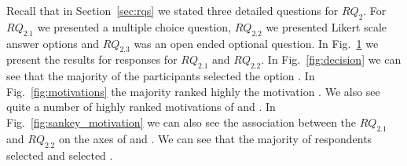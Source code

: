 \begin{figure}[ht]
\centering
\vspace{-.3cm}
    \hfill
    \hfill
    \hfill
    \caption{\rqTwo}
     \label{fig:decision_motivations}
     \vspace{-.3cm}
\end{figure}




\nd \textbf{\rqTwo}

Recall that in Section~\ref{sec:rqs} we stated three detailed questions for $RQ_{2}$. For $RQ_{2.1}$ we presented a multiple choice question, $RQ_{2.2}$ we presented Likert scale answer options and $RQ_{2.3}$ was an open ended optional question. 
In Fig.~\ref{fig:decision_motivations} we present the results for responses for $RQ_{2.1}$ and $RQ_{2.2}$. In Fig.~\ref{fig:decision} we can see that the majority of the participants selected the option . In Fig.~\ref{fig:motivations} the majority ranked highly the motivation . We also see quite a number of highly ranked motivations of  and . In Fig.~\ref{fig:sankey_motivation} we can also see the association between the $RQ_{2.1}$ and $RQ_{2.2}$ on the axes of  and . We can see that the majority of respondents selected  and selected . 

